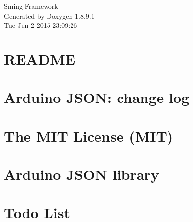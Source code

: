 \documentclass[twoside]{book}
\newcommand{\+}{\discretionary{\mbox{\scriptsize$\hookleftarrow$}}{}{}}
\newcommand{\clearemptydoublepage}{%
  \newpage{\pagestyle{empty}\cleardoublepage}%
}
\begin{document}
\hypersetup{pageanchor=false,
             bookmarks=true,
             bookmarksnumbered=true,
             pdfencoding=unicode
            }
\begin{titlepage}
\vspace*{7cm}
\begin{center}%
{\Large Sming Framework }\\
\vspace*{1cm}
{\large Generated by Doxygen 1.8.9.1}\\
\vspace*{0.5cm}
{\small Tue Jun 2 2015 23:09:26}\\
\end{center}
\end{titlepage}
\clearemptydoublepage
\tableofcontents
\clearemptydoublepage
{}
\hypersetup{pageanchor=true}

\chapter{R\+E\+A\+D\+M\+E}
\label{md__libraries__t_f_t__i_l_i9163_c__r_e_a_d_m_e}
\hypertarget{md__libraries__t_f_t__i_l_i9163_c__r_e_a_d_m_e}{}

\chapter{Arduino J\+S\+O\+N\+: change log}
\label{md__services__arduino_json__c_h_a_n_g_e_l_o_g}
\hypertarget{md__services__arduino_json__c_h_a_n_g_e_l_o_g}{}

\chapter{The M\+I\+T License (M\+I\+T)}
\label{md__services__arduino_json__l_i_c_e_n_s_e}
\hypertarget{md__services__arduino_json__l_i_c_e_n_s_e}{}

\chapter{Arduino J\+S\+O\+N library}
\label{md__services__arduino_json__r_e_a_d_m_e}
\hypertarget{md__services__arduino_json__r_e_a_d_m_e}{}

\chapter{Todo List}
\label{todo}
\hypertarget{todo}{}

\end{document}
